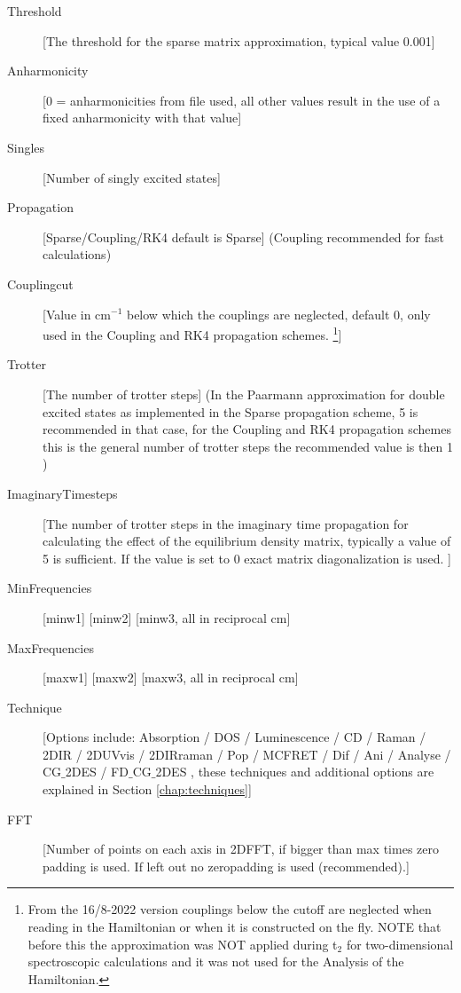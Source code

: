 \begin{description}
\item [Threshold][The threshold for the sparse matrix approximation, typical value 0.001]
\item [Anharmonicity] [0 = anharmonicities from file used, all other values result in the use of a fixed anharmonicity with that value]
\item [Singles] [Number of singly excited states]
\item [Propagation] [Sparse/Coupling/RK4 default is Sparse] (Coupling recommended for fast calculations)
\item [Couplingcut] [Value in cm$^{-1}$ below which the couplings are neglected, default 0, only used in the Coupling and RK4 propagation schemes. \footnote{From the 16/8-2022 version couplings below the cutoff are neglected when reading in the Hamiltonian or when it is constructed on the fly. NOTE that before this the approximation was NOT applied during t$_2$ for two-dimensional spectroscopic calculations and it was not used for the Analysis of the Hamiltonian.}]
\item [Trotter] [The number of trotter steps] (In the Paarmann approximation for double excited 
states as implemented in the Sparse propagation scheme, 5 is recommended in that case, for the Coupling and RK4 propagation schemes this is the general number of trotter steps the recommended value is then 1 )
\item [ImaginaryTimesteps] [The number of trotter steps in the imaginary time propagation for calculating the effect of the equilibrium density matrix, typically a value of 5 is sufficient. If the value is set to 0 exact matrix diagonalization is used. ]
\item [MinFrequencies] [minw1] [minw2] [minw3, all in reciprocal cm]
\item [MaxFrequencies] [maxw1] [maxw2] [maxw3, all in reciprocal cm]
\item [Technique] [Options include: Absorption / DOS / Luminescence / CD / Raman / 2DIR / 2DUVvis / 2DIRraman / Pop / MCFRET / Dif /
 Ani / Analyse / CG$\_$2DES / FD$\_$CG$\_$2DES , these techniques and additional options are explained in Section \ref{chap:techniques}]
\item [FFT] [Number of points on each axis in 2DFFT, if bigger than max times zero padding is used. If left out no zeropadding is used (recommended).]

\end{description}
